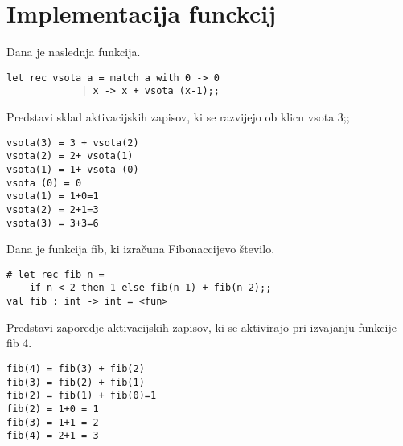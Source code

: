 \section{Implementacija funckcij}




\begin{ex}
Dana je naslednja funkcija.
\begin{lstlisting}
let rec vsota a = match a with 0 -> 0 
             | x -> x + vsota (x-1);;
\end{lstlisting}

Predstavi sklad aktivacijskih zapisov, ki se razvijejo ob klicu vsota 3;;

\begin{sol}
\begin{lstlisting}
vsota(3) = 3 + vsota(2)
vsota(2) = 2+ vsota(1)
vsota(1) = 1+ vsota (0)
vsota (0) = 0
vsota(1) = 1+0=1
vsota(2) = 2+1=3
vsota(3) = 3+3=6
\end{lstlisting}
\end{sol}
\end{ex}




\begin{ex}
Dana je funkcija fib, ki izra\v cuna Fibonaccijevo \v stevilo.

\begin{lstlisting}
# let rec fib n =
    if n < 2 then 1 else fib(n-1) + fib(n-2);;
val fib : int -> int = <fun>
\end{lstlisting}
Predstavi zaporedje aktivacijskih zapisov, ki se aktivirajo pri izvajanju funkcije fib 4.

\begin{sol}
\begin{lstlisting}
fib(4) = fib(3) + fib(2)
fib(3) = fib(2) + fib(1)
fib(2) = fib(1) + fib(0)=1
fib(2) = 1+0 = 1
fib(3) = 1+1 = 2
fib(4) = 2+1 = 3
\end{lstlisting}
\end{sol}

\end{ex}






